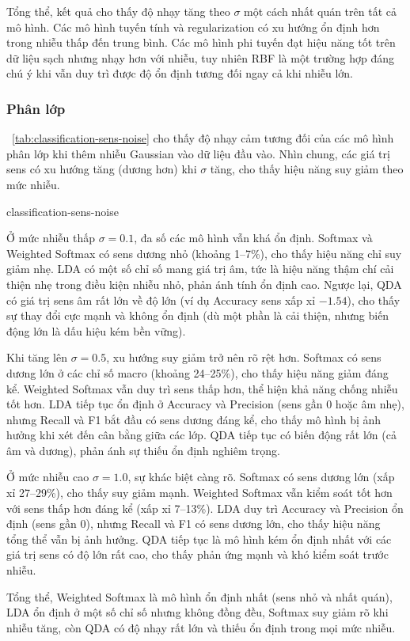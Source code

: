 Tổng thể, kết quả cho thấy độ nhạy tăng theo $\sigma$ một cách nhất quán trên
tất cả mô hình. Các mô hình tuyến tính và regularization có xu hướng ổn định
hơn trong nhiễu thấp đến trung bình. Các mô hình phi tuyến đạt hiệu năng tốt
trên dữ liệu sạch nhưng nhạy hơn với nhiễu, tuy nhiên RBF là một trường hợp
đáng chú ý khi vẫn duy trì được độ ổn định tương đối ngay cả khi nhiễu lớn.

\subsubsection{Phân lớp}

\tablename~\ref{tab:classification-sens-noise} cho thấy độ nhạy cảm tương đối
của các mô hình phân lớp khi thêm nhiễu Gaussian vào dữ liệu đầu vào. Nhìn
chung, các giá trị sens có xu hướng tăng (dương hơn) khi $\sigma$ tăng, cho
thấy hiệu năng suy giảm theo mức nhiễu.

{classification-sens-noise}


Ở mức nhiễu thấp $\sigma = 0.1$, đa số các mô hình vẫn khá ổn định. Softmax và
Weighted Softmax có sens dương nhỏ (khoảng 1--7\%), cho thấy hiệu năng chỉ suy
giảm nhẹ. LDA có một số chỉ số mang giá trị âm, tức là hiệu năng thậm chí cải
thiện nhẹ trong điều kiện nhiễu nhỏ, phản ánh tính ổn định cao. Ngược lại, QDA
có giá trị sens âm rất lớn về độ lớn (ví dụ Accuracy sens xấp xỉ $-1.54$), cho
thấy sự thay đổi cực mạnh và không ổn định (dù một phần là cải thiện, nhưng
biến động lớn là dấu hiệu kém bền vững).

Khi tăng lên $\sigma = 0.5$, xu hướng suy giảm trở nên rõ rệt hơn. Softmax có
sens dương lớn ở các chỉ số macro (khoảng 24--25\%), cho thấy hiệu năng giảm
đáng kể. Weighted Softmax vẫn duy trì sens thấp hơn, thể hiện khả năng chống
nhiễu tốt hơn. LDA tiếp tục ổn định ở Accuracy và Precision (sens gần 0 hoặc âm
nhẹ), nhưng Recall và F1 bắt đầu có sens dương đáng kể, cho thấy mô hình bị ảnh
hưởng khi xét đến cân bằng giữa các lớp. QDA tiếp tục có biến động rất lớn (cả
âm và dương), phản ánh sự thiếu ổn định nghiêm trọng.

Ở mức nhiễu cao $\sigma = 1.0$, sự khác biệt càng rõ. Softmax có sens dương lớn
(xấp xỉ 27--29\%), cho thấy suy giảm mạnh. Weighted Softmax vẫn kiểm soát tốt
hơn với sens thấp hơn đáng kể (xấp xỉ 7--13\%). LDA duy trì Accuracy và
Precision ổn định (sens gần 0), nhưng Recall và F1 có sens dương lớn, cho thấy
hiệu năng tổng thể vẫn bị ảnh hưởng. QDA tiếp tục là mô hình kém ổn định nhất
với các giá trị sens có độ lớn rất cao, cho thấy phản ứng mạnh và khó kiểm soát
trước nhiễu.

Tổng thể, Weighted Softmax là mô hình ổn định nhất (sens nhỏ và nhất quán), LDA
ổn định ở một số chỉ số nhưng không đồng đều, Softmax suy giảm rõ khi nhiễu
tăng, còn QDA có độ nhạy rất lớn và thiếu ổn định trong mọi mức nhiễu.
